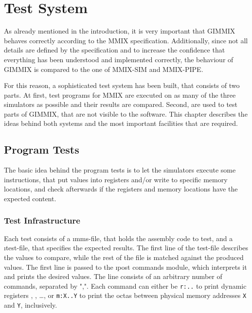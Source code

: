 \chapter{Test System}

As already mentioned in the introduction, it is very important that GIMMIX behaves correctly according to the MMIX specification. Additionally, since not all details are defined by the specification and to increase the confidence that everything has been understood and implemented correctly, the behaviour of GIMMIX is compared to the one of MMIX-SIM and MMIX-PIPE.

For this reason, a sophisticated test system has been built, that consists of two parts. At first, test programs for MMIX are executed on as many of the three simulators as possible and their results are compared. Second,  are used to test parts of GIMMIX, that are not visible to the software. This chapter describes the ideas behind both systems and the most important facilities that are required.

\section{Program Tests}

The basic idea behind the program tests is to let the simulators execute some instructions, that put values into registers and/or write to specific memory locations, and check afterwards if the registers and memory locations have the expected content.

\subsection{Test Infrastructure}

Each test consists of a \i{mms-file}, that holds the assembly code to test, and a \i{test-file}, that specifies the expected results. The first line of the test-file describes the values to compare, while the rest of the file is matched against the produced values. The first line is passed to the \i{post commands} module, which interprets it and prints the desired values. The line consists of an arbitrary number of commands, separated by ",". Each command can either be {\tt r:..} to print dynamic registers , , \dots,  or {\tt m:X..Y} to print the octas between physical memory addresses {\tt X} and {\tt Y}, inclusively.

